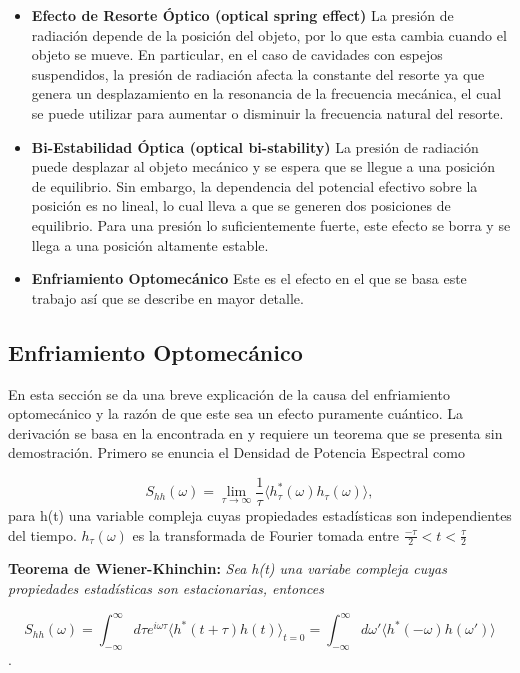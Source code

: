 \documentclass[10pt,a4paper]{report}
\begin{document}
\begin{itemize}
\item \textbf{Efecto de Resorte Óptico (optical spring effect)} La
  presión de radiación depende de la posición del objeto, por lo que esta
  cambia cuando el objeto se mueve. En particular, en el caso de
  cavidades con espejos suspendidos, la presión de radiación afecta la
  constante del resorte ya que genera un desplazamiento en la
  resonancia de la frecuencia mecánica, el cual se puede utilizar para
  aumentar o disminuir la frecuencia natural del
  resorte.\cite{BraginskyPE}

\item \textbf{Bi-Estabilidad Óptica (optical bi-stability)} La presión
  de radiación puede desplazar al objeto mecánico y se espera que se
  llegue a una posición de equilibrio. Sin embargo, la dependencia del
  potencial efectivo sobre la posición es no lineal, lo cual lleva a
  que se generen dos posiciones de equilibrio. Para una presión lo
  suficientemente fuerte, este efecto se borra y se llega a una
  posición altamente estable\cite{DorselOB}.

\item \textbf{Enfriamiento Optomecánico} Este es el efecto en el que se basa este trabajo así que se describe en mayor detalle. 
\end{itemize}

\subsection{Enfriamiento Optomecánico}

En esta sección se da una breve explicación de la causa del enfriamiento optomecánico y la razón de que este sea un efecto puramente cuántico. La derivación se basa en la encontrada en \cite{WarwickQO} y requiere un teorema que se presenta sin demostración. Primero se enuncia el  Densidad de Potencia Espectral como

\begin{equation}
S_{hh}(\omega) = \lim_{\tau \to\infty} \frac{1}{\tau}\langle h_\tau^*(\omega)h_\tau(\omega) \rangle ,
\end{equation} para h(t) una variable compleja cuyas propiedades estadísticas son independientes del tiempo. $h_\tau(\omega)$ es la transformada de Fourier tomada entre $\frac{-\tau}{2}< t < \frac{\tau}{2}$

\begin{center}
\textbf{Teorema de Wiener-Khinchin:} \textit{Sea h(t) una variabe compleja cuyas propiedades estadísticas son estacionarias, entonces }

\begin{equation} \label{WienerKhichin}
S_{hh}(\omega) = \int_{-\infty}^\infty d\tau e^{i\omega \tau} \langle h^*(t+\tau)h(t) \rangle_{t=0} = \int_{-\infty}^\infty d\omega' \langle h^*(-\omega) h(\omega') \rangle
\end{equation}
.
\end{center}
\end{document}
